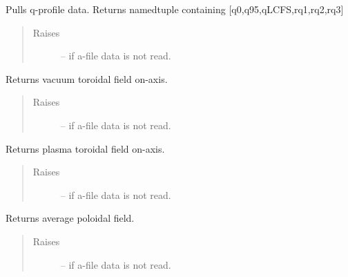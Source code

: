 \documentclass[letterpaper,10pt,english]{sphinxmanual}
\begin{document}
\begin{fulllineitems}
\begin{fulllineitems}
\label{eqtools:eqtools.eqdskreader.EqdskReader.getQs}
Pulls q-profile data.
Returns namedtuple containing {[}q0,q95,qLCFS,rq1,rq2,rq3{]}
\begin{quote}\begin{description}
\item[{Raises }] \leavevmode
{} -- 
if a-file data is not read.

\end{description}\end{quote}

\end{fulllineitems}


\begin{fulllineitems}
\label{eqtools:eqtools.eqdskreader.EqdskReader.getBtVac}
Returns vacuum toroidal field on-axis.
\begin{quote}\begin{description}
\item[{Raises }] \leavevmode
{} -- 
if a-file data is not read.

\end{description}\end{quote}

\end{fulllineitems}


\begin{fulllineitems}
\label{eqtools:eqtools.eqdskreader.EqdskReader.getBtPla}
Returns plasma toroidal field on-axis.
\begin{quote}\begin{description}
\item[{Raises }] \leavevmode
{} -- 
if a-file data is not read.

\end{description}\end{quote}

\end{fulllineitems}


\begin{fulllineitems}
\label{eqtools:eqtools.eqdskreader.EqdskReader.getBpAvg}
Returns average poloidal field.
\begin{quote}\begin{description}
\item[{Raises }] \leavevmode
{} -- 
if a-file data is not read.


\end{description}
\end{quote}
\end{fulllineitems}
\end{fulllineitems}
\end{document}
